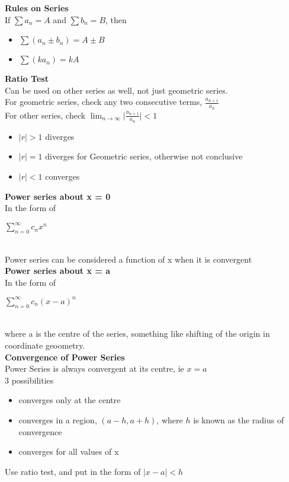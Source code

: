 \documentclass[10pt, a4paper]{article}
\begin{document}
\begin{multicols*}{3}
	\textbf{Rules on Series}\\
	If $\sum a_n = A$ and $\sum b_n = B$, then 
	\begin{itemize}
		\item $\sum (a_n \pm b_n) = A \pm B$
		\item $\sum (ka_n) = kA$ 
	\end{itemize} 

	\textbf{Ratio Test}\\
	Can be used on other series as well, not just geometric series.\\
	For geometric series, check any two consecutive terms, $\frac{a_{n+1}}{a_n}$\\
	For other series, check $\lim_{n \to \infty} \lvert \frac{a_{n+1}}{a_n}\rvert < 1$
	\begin{itemize}
		\setlength\itemsep{0em}
		\item $\lvert r \rvert > 1$ diverges
		\item $\lvert r \rvert = 1$ diverges for Geometric series, otherwise not conclusive
		\item $\lvert r \rvert < 1$ converges
	\end{itemize}
	
	\textbf{Power series about x = 0}\\
	In the form of \\
	\centerline{$\sum_{n = 0}^{\infty} c_nx^n$}\\
	Power series can be considered a function of x when it is convergent\\
	
	\textbf{Power series about x = a}\\
	In the form of \\
	\centerline{$\sum_{n = 0}^{\infty} c_n (x - a)^n$}\\
	where a is the centre of the series, something like shifting of the origin in coordinate geoometry.\\
	
	\textbf{Convergence of Power Series}\\
	Power Series is always convergent at its centre, ie $x = a$\\
	3 possibilities
	\begin{itemize}
		\setlength\itemsep{0em}
		\item converges only at the centre
		\item converges in a region, $(a - h, a + h)$, where $h$ is known as the radius of convergence
		\item converges for all values of x
	\end{itemize}
	Use ratio test, and put in the form of $\lvert x - a \rvert < h$\\
	

\end{multicols*}
\end{document}
